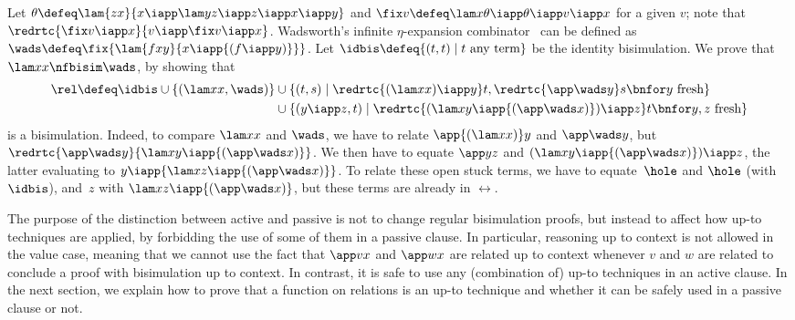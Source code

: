 \documentclass{lmcs}
\theoremstyle{defC}
\begin{document}
\begin{exa}%
  \label{ex:wads}
  Let $\theta \defeq \lam{zx}{x \iapp \lam y {z \iapp z \iapp x \iapp y}}$ and
  $\fix v \defeq \lam x {\theta \iapp \theta \iapp v \iapp x}$ for a given $v$;
  note that $\redrtc{\fix v \iapp x}{v \iapp \fix v \iapp x}$. Wadsworth's
  infinite $\eta$-expansion combinator~\cite{Barendregt:84} can be defined as
  $\wads \defeq \fix{\lam {fxy}{x \iapp {(f \iapp y)}}}$. Let
  $\idbis \defeq \{ (t, t) \mid t \mbox{ any term} \}$ be the
  identity bisimulation. We prove that $\lam x x \nfbisim \wads$, by showing
  that
  \begin{align*}
    \mathord{\rel} \defeq \idbis \cup \{(\lam x x, \wads) \}
    &  \cup \{ (t, s) \mid \redrtc{(\lam x x)
                                   \iapp y} t, \redrtc{\app \wads y} s \bnfor y \mbox{
                                   fresh} \} \\
                                 & \cup \{ (y \iapp z, t) \mid \redrtc{(\lam x {y
                                   \iapp {(\app \wads x)}})
                                   \iapp z} t \bnfor y, z \mbox{
                                   fresh} \}
  \end{align*}
  is a bisimulation. Indeed, to compare $\lam x x$ and $\wads$, we have to
  relate $\app {(\lam x x)} y$ and $\app \wads y$, but $\redrtc{\app \wads
    y}{\lam x {y \iapp {(\app \wads x)}}}$. We then have to equate $\app y z$
  and $(\lam x {y \iapp {(\app \wads x)}}) \iapp z$, the latter evaluating to $y
  \iapp {\lam x {z \iapp {(\app \wads x)}}}$. To relate these open stuck terms,
  we have to equate~$\hole$ and $\hole$ (with $\idbis$), and~$z$ with $\lam x {z
    \iapp {(\app \wads x)}}$, but these terms are already in $\rel$.
\end{exa}


The purpose of the distinction between active and passive is not to change
regular bisimulation proofs, but instead to affect how up-to techniques are
applied, by forbidding the use of some of them in a passive clause. In
particular, reasoning up to context is not allowed in the value case, meaning
that we cannot use the fact that $\app v x$ and $\app w x$ are related up to
context whenever $v$ and $w$ are related to conclude a proof with bisimulation
up to context. In contrast, it is safe to use any (combination of) up-to
techniques in an active clause. In the next section, we explain how to prove
that a function on relations is an up-to technique and whether it can be safely
used in a passive clause or not.
\end{document}
